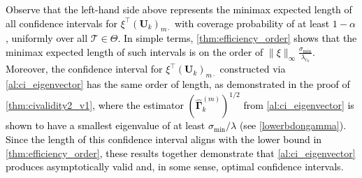 \documentclass[10pt]{article}
\newcommand{\0}{{\mathbf{0}}}
\newcommand{\1}{{\mathbf{1}}}
\renewcommand{\t}{^{\top}}
\renewcommand{\hat}{\widehat}
\renewcommand{\hat}{\widehat}
\begin{document}
\textcolor{black}{Observe that the left-hand side above represents the minimax expected length of all confidence intervals for $\xi^\top (\mathbf{U}_k)_{m\cdot}$ with coverage probability of at least $1 - \alpha$, uniformly over all $\mathcal{T} \in \Theta$. In simple terms, \cref{thm:efficiency_order} shows that the minimax expected length of such intervals is on the order of $\|\xi\|_{\infty} \frac{\sigma_{\min}}{\lambda_{r_k}}$. Moreover, the confidence interval for $\xi^\top (\mathbf{U}_k)_{m\cdot}$ constructed via \cref{al:ci_eigenvector} has the same order of length, as demonstrated in the proof of \cref{thm:civalidity2_v1}, where the estimator $(\mathbf{\hat \Gamma}_k^{(m)})^{1/2}$ from \cref{al:ci_eigenvector} is shown to have a smallest eigenvalue of at least $\sigma_{\min}/\lambda$ (see \eqref{lowerbdongamma}). Since the length of this confidence interval aligns with the lower bound in \cref{thm:efficiency_order}, these results together demonstrate that \cref{al:ci_eigenvector} produces asymptotically valid and, in some sense, optimal confidence intervals.
} 
 
 
\end{document}
